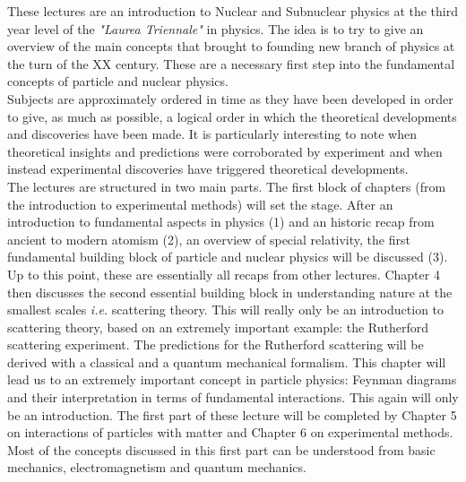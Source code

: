 %
%

\preface

These lectures are an introduction to Nuclear and Subnuclear physics at the third year level of the {\it "Laurea Triennale"} in physics. The idea is to try to give an overview of the main concepts that brought to founding new branch of physics at the turn of the XX century. These are a necessary first step into the fundamental concepts of particle and nuclear physics.  \\

Subjects are approximately ordered in time as they have been developed in order to give, as much as possible, a logical order in which the theoretical developments and discoveries have been made. It is particularly interesting to note when theoretical insights and predictions were corroborated by experiment and when instead experimental discoveries have triggered theoretical developments. \\

The lectures are structured in two main parts. The first block of chapters (from the introduction to experimental methods) will set the stage. After an introduction to fundamental aspects in physics (1) and an historic recap from ancient to modern atomism (2), an overview of special relativity, the first fundamental building block of particle and nuclear physics will be discussed (3). Up to this point, these are essentially all recaps from other lectures. Chapter 4 then discusses the second essential building block in understanding nature at the smallest scales {\it i.e.} scattering theory. This will really only be an introduction to scattering theory, based on an extremely important example: the Rutherford scattering experiment. The predictions for the Rutherford scattering will be derived with a classical and a quantum mechanical formalism. This chapter will lead us to an extremely important concept in particle physics: Feynman diagrams and their interpretation in terms of fundamental interactions. This again will only be an introduction. The first part of these lecture will be completed by Chapter 5 on interactions of particles with matter and Chapter 6 on experimental methods. Most of the concepts discussed in this first part can be understood from basic mechanics, electromagnetism and quantum mechanics. \\

